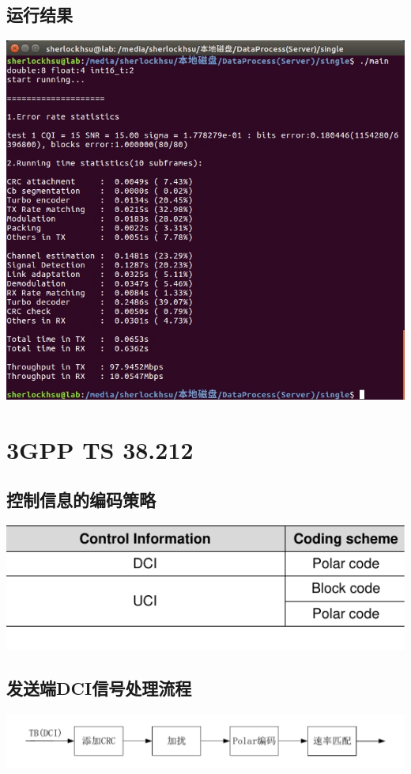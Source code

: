 \documentclass{article}
\begin{document}
\subsection{运行结果}
\includegraphics[width = .9\textwidth]{resSingle.jpg}

\section{3GPP TS 38.212}

\subsection{控制信息的编码策略}
\includegraphics[width = .8\textwidth]{table_CI.pdf}

\subsection{发送端DCI信号处理流程}
\includegraphics[width = \textwidth]{Tx_DCI_flow.pdf}
\end{document}
